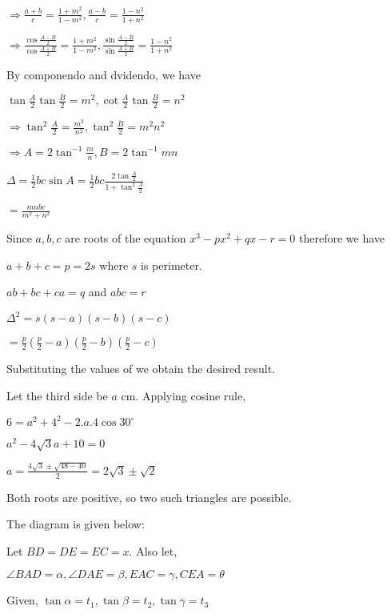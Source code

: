   $\Rightarrow \frac{a + b }{c} = \frac{1 + m^2}{1 - m^2}, \frac{a - b}{c} = \frac{1 - n^2}{1 + n^2}$

  $\Rightarrow \frac{\cos\frac{A - B}{2}}{\cos\frac{A + B}{2}} = \frac{1 + m^2}{1 - m^2}, \frac{\sin\frac{A -
    B}{2}}{\sin\frac{A + B}{2}} = \frac{1 - n^2}{1 + n^2}$

  By componendo and dvidendo, we have

  $\tan\frac{A}{2}\tan\frac{B}{2} = m^2, \cot\frac{A}{2}\tan\frac{B}{2} = n^2$

  $\Rightarrow \tan^2\frac{A}{2} = \frac{m^2}{n^2}, \tan^2\frac{B}{2} = m^2n^2$

  $\Rightarrow A = 2\tan^{-1}\frac{m}{n}, B = 2\tan^{-1}mn$

  $\Delta = \frac{1}{2}bc\sin A = \frac{1}{2}bc\frac{2\tan\frac{A}{2}}{1 + \tan^2\frac{A}{2}}$

  $= \frac{mnbc}{m^2 + n^2}$

\item Since $a,b,c$ are roots of the equation $x^3 - px^2 + qx - r = 0$ therefore we have

  $a + b + c = p = 2s$ where $s$ is perimeter.

  $ab + bc + ca = q$ and $abc = r$

  $\Delta^2 = s(s- a)(s - b)(s - c)$

  $= \frac{p}{2}\left(\frac{p}{2} -a\right)\left(\frac{p}{2} - b\right)\left(\frac{p}{2} - c\right)$

  Substituting the values of we obtain the desired result.

\item Let the third side be $a$ cm. Applying cosine rule,

  $6 = a^2 + 4^2 - 2.a.4\cos30^\circ$

  $a^2 - 4\sqrt{3}a + 10 = 0$

  $a = \frac{4\sqrt{3}\pm\sqrt{48 - 40}}{2} = 2\sqrt{3} \pm \sqrt{2}$

  Both roots are positive, so two such triangles are possible.
\item The diagram is given below:

  \startplacefigure
    \externalfigure[18_15.pdf]
  \stopplacefigure

  Let $BD = DE = EC = x.$ Also let,

  $\angle BAD = \alpha, \angle DAE = \beta, EAC = \gamma, CEA = \theta$

  Given, $\tan\alpha = t_1, \tan\beta = t_2, \tan\gamma = t_3$

